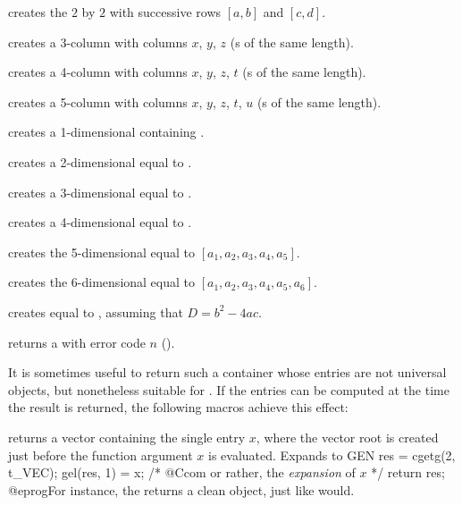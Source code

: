  creates the $2$ by $2$
 with successive rows $[a,b]$ and $[c,d]$.

 creates a 3-column  with columns
$x$, $y$, $z$ (s of the same length).

 creates a 4-column 
with columns $x$, $y$, $z$, $t$ (s of the same length).

 creates a 5-column
 with columns $x$, $y$, $z$, $t$, $u$ (s of the same
length).

 creates a 1-dimensional  containing .

 creates a 2-dimensional  equal to
\kbd{[x,y]}.

 creates a 3-dimensional 
equal to \kbd{[x,y,z]}.

 creates a 4-dimensional 
equal to \kbd{[x,y,z,t]}.

 creates the
5-dimensional  equal to $[a_1,a_2,a_3,a_4,a_5]$.

 creates the
6-dimensional  equal to $[a_1,a_2,a_3,a_4,a_5,a_6]$.

 creates  equal
to , assuming that $D = b^2 - 4ac$.

 returns a  with error code $n$
().

\smallskip

It is sometimes useful to return such a container whose entries are not
universal objects, but nonetheless suitable for .
If the entries can be computed at the time the result is returned, the
following macros achieve this effect:

 returns a vector containing the single entry $x$,
where the vector root is created just before the function argument $x$ is
evaluated. Expands to
\bprog
  {
    GEN res = cgetg(2, t_VEC);
    gel(res, 1) = x; /* @Ccom or rather, the \emph{expansion} of $x$ */
    return res;
  }
@eprog\noindent For instance, the  returns a clean
object, just like  would.

